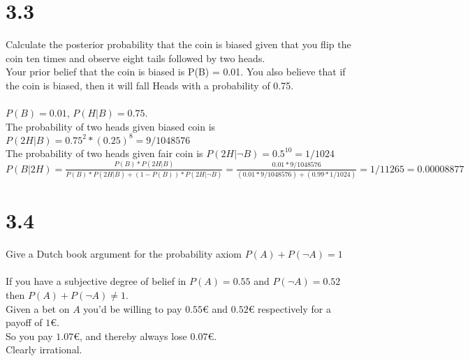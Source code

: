 \documentclass{article}
\begin{document}
\section*{3.3}
Calculate the posterior probability that the coin is biased given that you flip the coin ten times and observe eight tails followed by two heads. \\ 
Your prior belief that the coin is biased is P(B) = 0.01. You also believe that if the coin is biased, then it will fall Heads with a probability of 0.75.\\ \\
$P(B) = 0.01$, $P(H|B) = 0.75$. \\
The probability of two heads given biased coin is $P(2H|B) = 0.75^{2}*(0.25)^{8} = 9/1048576 $ \\
The probability of two heads given fair coin is $P(2H|\neg B) = 0.5^{10} = 1/1024 $ \\
$P(B|2H) = \frac{P(B)*P(2H|B)}{P(B)*P(2H|B)+(1-P(B))*P(2H|\neg B)} = \frac{0.01*9/1048576}{(0.01*9/1048576)+(0.99*1/1024)} = 1/11265 = 0.00008877$ \\

\section*{3.4}
Give a Dutch book argument for the probability axiom $P(A)+P(\neg A)=1$ \\ \\
If you have a subjective degree of belief in $P(A) = 0.55$ and $P(\neg A) = 0.52$ then $P(A)+P(\neg A) \neq 1$. \\
Given a bet on $A$ you'd be willing to pay $0.55€$ and $0.52€$ respectively for a payoff of $1€$. \\
So you pay $1.07€$, and thereby always lose $0.07€$. \\ 
Clearly irrational. \\ 
\end{document}
